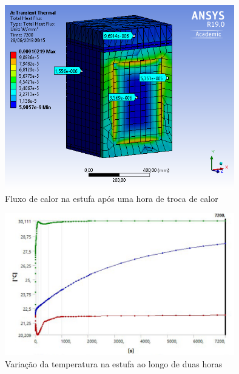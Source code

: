 \begin{figure}[H]
	\centering
	\includegraphics[width=10cm]{figuras/heatflux.png}
	\caption{Fluxo de calor na estufa após uma hora de troca de calor}
	\label{fig:heatflux}
\end{figure}
\begin{figure}[H]
	\centering
	\includegraphics[width=10cm]{figuras/grafico_temperatura.PNG}
	\caption{Variação da temperatura na estufa ao longo de duas horas}
	\label{fig:grafico_temperatura}
\end{figure}